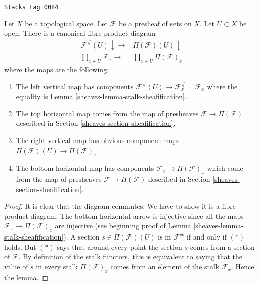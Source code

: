 \begin{lemma}
\label{sheaves-lemma-diagram-fibre-product}
\href{https://stacks.math.columbia.edu/tag/0084}{\texttt{Stacks tag 0084}}

Let $X$ be a topological space. Let $\mathcal{F}$ be
a presheaf of sets on $X$. Let $U \subset X$ be open.
There is a canonical fibre product diagram
$$
\begin{array}{cc}\mathcal{F}^\#(U) \downarrow\longrightarrow & \Pi(\mathcal{F})(U) \downarrow \\ \prod_{x \in U} \mathcal{F}_x
\longrightarrow & \prod_{x \in U} \Pi(\mathcal{F})_x\end{array}
$$
where the maps are the following:
\begin{enumerate}
\item The left vertical map has components
$\mathcal{F}^\#(U) \to \mathcal{F}^\#_x = \mathcal{F}_x$
where the equality is Lemma \ref{sheaves-lemma-stalk-sheafification}.
\item The top horizontal map comes from the
map of presheaves $\mathcal{F} \to \Pi(\mathcal{F})$ described
in Section \ref{sheaves-section-sheafification}.
\item The right vertical map has obvious component
maps $\Pi(\mathcal{F})(U) \to \Pi(\mathcal{F})_x$.
\item The bottom horizontal map has components
$\mathcal{F}_x \to \Pi(\mathcal{F})_x$
which come from the map of presheaves
$\mathcal{F} \to \Pi(\mathcal{F})$ described
in Section \ref{sheaves-section-sheafification}.
\end{enumerate}
\end{lemma}

\begin{proof}

It is clear that the diagram commutes. We have to show
it is a fibre product diagram. The bottom horizontal arrow
is injective since all the maps $\mathcal{F}_x \to \Pi(\mathcal{F})_x$
are injective (see beginning proof of
Lemma \ref{sheaves-lemma-stalk-sheafification}).
A section $s \in \Pi(\mathcal{F})(U)$ is in $\mathcal{F}^\#$ if and
only if $(*)$ holds. But $(*)$ says that around every point
the section $s$ comes from a section of $\mathcal{F}$. By definition
of the stalk functors, this is equivalent to saying that
the value of $s$ in every stalk $\Pi(\mathcal{F})_x$ comes
from an element of the stalk $\mathcal{F}_x$. Hence the lemma.
\end{proof}


